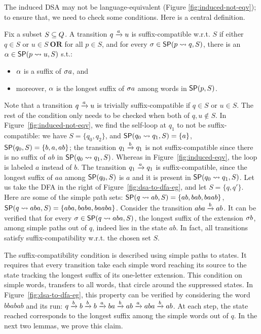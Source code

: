 The induced DSA may not be language-equivalent (Figure
\ref{fig:induced-not-eqv}); to ensure that, we need to check some
conditions. Here is a central definition.

\begin{definition}\label{def:suffix-compatibility}
  Fix a subset $S \subseteq Q$. A transition $q \xrightarrow{a} u$ is
  suffix-compatible w.r.t. $S$ if either
  $q \in S$ or $u \in S~\textbf{OR}$ for all $p \in S$, and for every
  $\sigma \in \mathsf{SP}(p \rightsquigarrow q, S)$, there is an $\alpha \in \mathsf{SP}(p \rightsquigarrow u, S)$ s.t.:
  \begin{itemize}
  \item $\alpha$ is a suffix of $\sigma a$, and
  \item moreover, $\alpha$ is the longest suffix of $\sigma a$ among words in
    $\mathsf{SP}(p, S)$.
  \end{itemize}
\end{definition}

Note that a transition $q \xrightarrow{a} u$ is trivially suffix-compatible if
$q \in S$ or $u \in S$. The rest of the condition only needs to be
checked when both of $q,u \notin S$. In
Figure~\ref{fig:induced-not-eqv}, we find the self-loop at $q_1$ to
not be suffix-compatible: we have $S = \{q_0, q_2\}$, and
$\mathsf{SP}(q_0 \rightsquigarrow q_1, S) = \{ a \}$, $\mathsf{SP}(q_0, S) = \{b, a, ab\}$; the
transition $q_1 \xrightarrow{b} q_1$ is not suffix-compatible since there is
no suffix of $ab$ in $\mathsf{SP}(q_0 \rightsquigarrow q_1, S)$. Whereas in
Figure~\ref{fig:induced-eqv}, the loop is labeled $a$ instead of
$b$. The transition $q_1 \xrightarrow{a} q_1$ is suffix-compatible, since the longest suffix of $aa$ among $\mathsf{SP}(q_0, S)$ is $a$ and it is
present in $\mathsf{SP}(q_0 \rightsquigarrow q_1, S)$. Let us take the DFA in the right of
Figure~\ref{fig:dsa-to-dfa-eg}, and let $S = \{q, q'\}$. Here are some
of the simple path sets: $\mathsf{SP}(q \rightsquigarrow ab, S) = \{ab, bab, baab\}$,
$\mathsf{SP}(q \rightsquigarrow aba, S) = \{aba, baba, baaba\}$. Consider the transition
$aba \xrightarrow{b} ab$. It can be verified that for every
$\sigma \in \mathsf{SP}(q \rightsquigarrow aba, S)$, the longest suffix of the extension
$\sigma b$, among simple paths out of $q$, indeed lies in the state $ab$.
In fact, all transitions satisfy suffix-compatibility w.r.t. the
chosen set $S$.


The suffix-compatibility condition is described using simple paths to
states. It requires that every transition take each simple word
reaching its source to the state tracking the longest suffix of its
one-letter extension. This condition on simple words, transfers to all
words, that circle around the suppressed states. In
Figure~\ref{fig:dsa-to-dfa-eg}, this property can be verified by
considering the word $bbabab$ and its run: $q \xrightarrow{b} b \xrightarrow{b} b \xrightarrow{a} ba \xrightarrow{b} ab \xrightarrow{a} aba \xrightarrow{b} ab$.
At each step, the state reached corresponds to the longest suffix
among the simple words out of $q$.
In the next two lemmas, we prove this claim.

